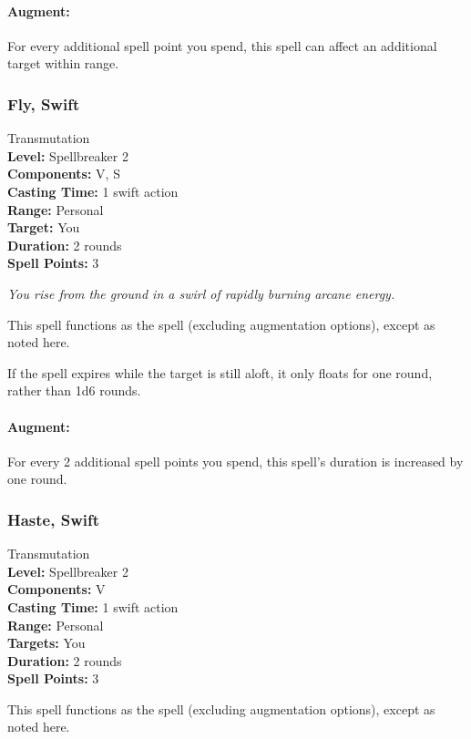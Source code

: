 \paragraph{Augment:} For every additional spell point you spend, this spell can affect an additional target within range.
\subsubsection[Swift Fly]{Fly, Swift}
\label{Spell:SwiftFly}
Transmutation
\\ \textbf{Level:} Spellbreaker 2
\\ \textbf{Components:} V, S
\\ \textbf{Casting Time:} 1 swift action
\\ \textbf{Range:} Personal
\\ \textbf{Target:} You
\\ \textbf{Duration:} 2 rounds
\\ \textbf{Spell Points:} 3

\emph{You rise from the ground in a swirl of rapidly burning arcane energy.}

This spell functions as the  spell (excluding augmentation options), except as noted here.

If the spell expires while the target is still aloft, it only floats for one round, rather than 1d6 rounds.

\paragraph{Augment:} For every 2 additional spell points you spend, this spell's duration is increased by one round.
\subsubsection[Swift Haste]{Haste, Swift}
\label{Spell:SwiftHaste}
Transmutation
\\ \textbf{Level:} Spellbreaker 2
\\ \textbf{Components:} V
\\ \textbf{Casting Time:} 1 swift action
\\ \textbf{Range:} Personal
\\ \textbf{Targets:} You
\\ \textbf{Duration:} 2 rounds
\\ \textbf{Spell Points:} 3

This spell functions as the  spell (excluding augmentation options), except as noted here.

